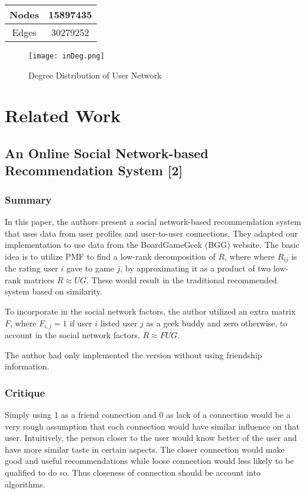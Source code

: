 \documentclass{article}
\begin{document}
\begin{center}

\begin{tabular}{|c|c|}
\hline
Nodes&15897435 \\ \hline
Edges&30279252 \\ \hline
\end{tabular}
\end{center}

\begin{figure}[h]
\begin{center}
\texttt{[image: inDeg.png]}
\caption{Degree Distribution of User Network}
\label{fig:degdis}
\end{center}
\end{figure}


\section{Related Work}
\subsection{An Online Social Network-based Recommendation System [2]}

\subsubsection{Summary}
In this paper, the authors present a social network-based recommendation system that uses data from user profiles and user-to-user connections. They adapted our implementation to use data from the BoardGameGeek (BGG) website. 
The basic idea is to utilize PMF to find a low-rank decomposition of $R$, where where $R_{ij}$ is the rating user $i$ gave to game $j$, by approximating it as a product of two low-rank matrices $R\approx UG$. These would result in the traditional recommended system based on similarity.

To incorporate in the social network factors, the author utilized an extra matrix $F$, where $F_{i,j} = 1$ if user $i$ listed user $j$ as a geek buddy and zero otherwise, to account in the social network factors, $R\approx FUG $.

The author had only implemented the version without using friendship information.

\subsubsection{Critique}
Simply using 1 as a friend connection and 0 as lack of a connection would be a very rough assumption that each connection would have similar influence on that user. Intuitively, the person closer to the user would know better of the user and have more similar taste in certain aspects. The closer connection would make good and useful recommendations while loose connection would less likely to be qualified to do so. Thus closeness of connection should be account into algorithms.
\end{document}
